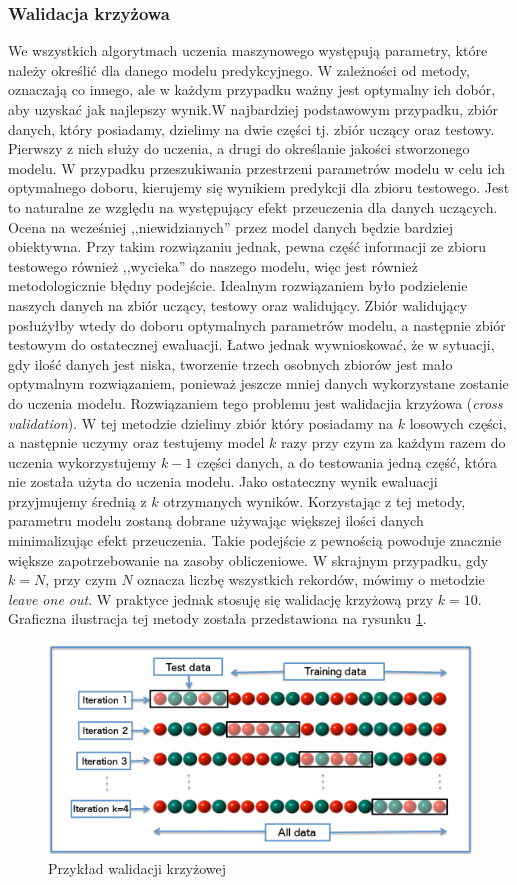 \subsubsection{Walidacja krzyżowa}
We wszystkich algorytmach uczenia maszynowego występują parametry, które należy określić dla danego modelu predykcyjnego. W zależności od metody, oznaczają co innego, ale w każdym przypadku ważny jest optymalny ich dobór, aby uzyskać jak najlepszy wynik.W najbardziej podstawowym przypadku, zbiór danych, który posiadamy, dzielimy na dwie części tj. zbiór uczący oraz testowy. Pierwszy z nich służy do uczenia, a drugi do określanie jakości stworzonego modelu. W przypadku przeszukiwania przestrzeni parametrów modelu w celu ich optymalnego doboru, kierujemy się wynikiem predykcji dla zbioru testowego. Jest to naturalne ze względu na występujący efekt przeuczenia dla danych uczących. Ocena na wcześniej ,,niewidzianych'' przez model danych będzie bardziej obiektywna. Przy takim rozwiązaniu jednak, pewna część informacji ze zbioru testowego również ,,wycieka'' do naszego modelu, więc jest również metodologicznie błędny podejście. Idealnym rozwiązaniem było podzielenie naszych danych na zbiór uczący, testowy oraz walidujący. Zbiór walidujący posłużyłby wtedy do doboru optymalnych parametrów modelu, a następnie zbiór testowym do ostatecznej ewaluacji. Łatwo jednak wywnioskować, że w sytuacji, gdy ilość danych jest niska, tworzenie trzech osobnych zbiorów jest mało optymalnym rozwiązaniem, ponieważ jeszcze mniej danych wykorzystane zostanie do uczenia modelu. Rozwiązaniem tego problemu jest walidacjia krzyżowa (\textit{cross validation}). W tej metodzie dzielimy zbiór który posiadamy na $k$ losowych części, a następnie uczymy oraz testujemy model $k$ razy przy czym za każdym razem do uczenia wykorzystujemy $k-1$ części danych, a do testowania jedną część, która nie została użyta do uczenia modelu. Jako ostateczny wynik ewaluacji przyjmujemy średnią z $k$ otrzymanych wyników. Korzystając z tej metody, parametru modelu zostaną dobrane używając większej ilości danych minimalizując efekt przeuczenia. Takie podejście z pewnością powoduje znacznie większe zapotrzebowanie na zasoby obliczeniowe. W skrajnym przypadku, gdy $k=N$, przy czym $N$ oznacza liczbę wszystkich rekordów, mówimy o metodzie \textit{leave one out}. W praktyce jednak stosuję się walidację krzyżową przy $k=10$. Graficzna ilustracja tej metody została przedstawiona na rysunku \ref{cv}.
\begin{figure}[ht!]
\centering
\includegraphics[scale=0.7]{res/cv.jpg}
\caption[Caption for LOF]{Przykład walidacji krzyżowej\footnotemark} \label{cv} 
\end{figure}

